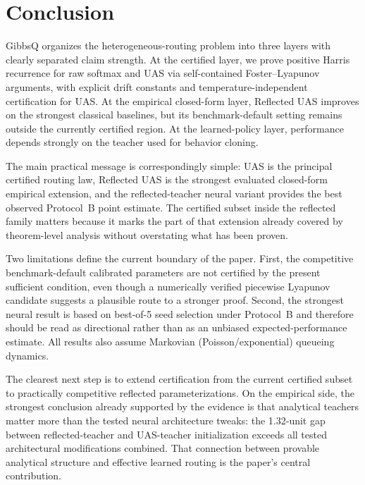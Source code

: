
\section{Conclusion}
\label{sec:conclusion}

GibbsQ organizes the heterogeneous-routing problem into three layers with clearly separated claim strength. At the certified layer, we prove positive Harris recurrence for raw softmax and UAS via self-contained Foster--Lyapunov arguments, with explicit drift constants and temperature-independent certification for UAS. At the empirical closed-form layer, Reflected UAS improves on the strongest classical baselines, but its benchmark-default setting remains outside the currently certified region. At the learned-policy layer, performance depends strongly on the teacher used for behavior cloning.

The main practical message is correspondingly simple: UAS is the principal certified routing law, Reflected UAS is the strongest evaluated closed-form empirical extension, and the reflected-teacher neural variant provides the best observed Protocol~B point estimate. The certified subset inside the reflected family matters because it marks the part of that extension already covered by theorem-level analysis without overstating what has been proven.

Two limitations define the current boundary of the paper. First, the competitive benchmark-default calibrated parameters are not certified by the present sufficient condition, even though a numerically verified piecewise Lyapunov candidate suggests a plausible route to a stronger proof. Second, the strongest neural result is based on best-of-5 seed selection under Protocol~B and therefore should be read as directional rather than as an unbiased expected-performance estimate. All results also assume Markovian (Poisson/exponential) queueing dynamics.

The clearest next step is to extend certification from the current certified subset to practically competitive reflected parameterizations. On the empirical side, the strongest conclusion already supported by the evidence is that analytical teachers matter more than the tested neural architecture tweaks: the 1.32-unit gap between reflected-teacher and UAS-teacher initialization exceeds all tested architectural modifications combined. That connection between provable analytical structure and effective learned routing is the paper's central contribution.
